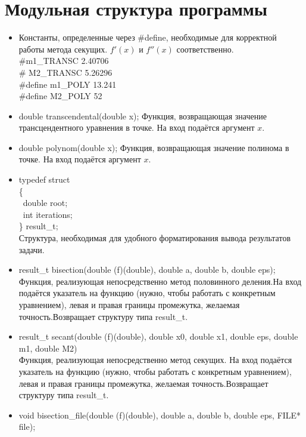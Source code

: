 \documentclass[12pt]{article}
\begin{document}
\section{Модульная структура программы}
\begin{itemize}
\item Константы, определенные через \#define, необходимые для корректной работы метода секущих. $f'(x)$ и $f''(x)$ соответственно.\\
\#m1\_TRANSC 2.40706\\
\# M2\_TRANSC 5.26296\\
\#define m1\_POLY 13.241\\
\#define M2\_POLY 52\\
\item double transcendental(double x); Функция, возвращающая значение трансцендентного уравнения в точке. На вход подаётся аргумент $x$.\\
\item double polynom(double x); Функция, возвращающая значение полинома в точке. На вход подаётся аргумент $x$.\\
\item typedef struct\\ 
\{\\
\	double root;\\
\	int iterations;\\
\} result\_t;\\
Структура, необходимая для удобного форматирования вывода результатов задачи.\\
\item result\_t bisection(double (f)(double), double a, double b, double eps);\\
Функция, реализующая непосредственно метод половинного деления.На вход подаётся указатель на функцию (нужно, чтобы работать с конкретным уравнением), левая и правая границы промежутка, желаемая точность.Возвращает структуру типа result\_t.\\
\item result\_t secant(double (f)(double), double x0, double x1, double eps, double m1, double M2)\\
Функция, реализующая непосредственно метод секущих. На вход подаётся указатель на функцию (нужно, чтобы работать с конкретным уравнением), левая и правая границы промежутка, желаемая точность.Возвращает структуру типа result\_t.\\
\item void bisection\_file(double (f)(double), double a, double b, double eps, FILE* file);\\

\end{itemize}
\end{document}
